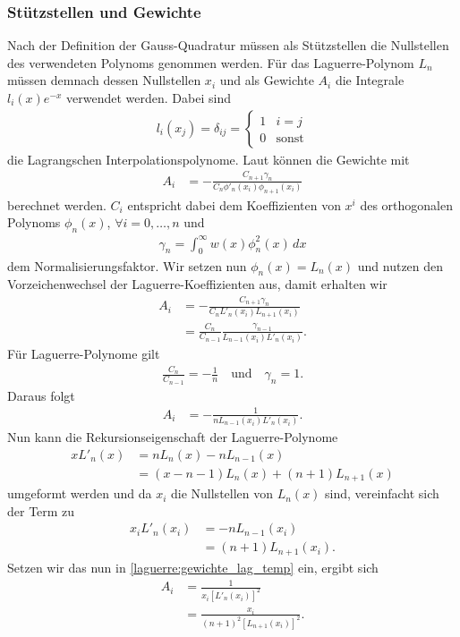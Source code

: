 \subsubsection{Stützstellen und Gewichte}
Nach der Definition der Gauss-Quadratur müssen als Stützstellen die Nullstellen
des verwendeten Polynoms genommen werden.
Für das Laguerre-Polynom $L_n$ müssen demnach dessen Nullstellen $x_i$ und
als Gewichte $A_i$ die Integrale $l_i(x)e^{-x}$ verwendet werden.
Dabei sind
\begin{align*}
l_i(x_j)
=
\delta_{ij}
=
\begin{cases}
1 & i=j      \\
0 & \text{sonst}
\end{cases}
\end{align*}
die Lagrangschen Interpolationspolynome.
Laut \cite{laguerre:hildebrand2013introduction} können die Gewichte mit
\begin{align*}
A_i
 & =
-\frac{C_{n+1} \gamma_n}{C_n \phi'_n(x_i) \phi_{n+1} (x_i)}
\end{align*}
berechnet werden.
$C_i$ entspricht dabei dem Koeffizienten von $x^i$
des orthogonalen Polynoms $\phi_n(x)$, $\forall i =0,\ldots,n$ und
\begin{align*}
\gamma_n
=
\int_0^\infty w(x) \phi_n^2(x)\,dx
\end{align*}
dem Normalisierungsfaktor.
Wir setzen nun $\phi_n(x) = L_n(x)$ und
nutzen den Vorzeichenwechsel der Laguerre-Koeffizienten aus,
damit erhalten wir
\begin{align*}
A_i
 & =
-\frac{C_{n+1} \gamma_n}{C_n L'_n(x_i) L_{n+1} (x_i)}
\\
 & = \frac{C_n}{C_{n-1}} \frac{\gamma_{n-1}}{L_{n-1}(x_i) L'_n(x_i)}
.
\end{align*}
Für Laguerre-Polynome gilt
\begin{align*}
\frac{C_n}{C_{n-1}}
=
-\frac{1}{n}
\quad \text{und} \quad
\gamma_n
=
1
.
\end{align*}
Daraus folgt
\begin{align}
A_i
&=
- \frac{1}{n L_{n-1}(x_i) L'_n(x_i)}
.
\label{laguerre:gewichte_lag_temp}
\end{align}
Nun kann die Rekursionseigenschaft der Laguerre-Polynome
\begin{align*}
x L'_n(x) 
&= 
n L_n(x) - n L_{n-1}(x)
\\
&= (x - n - 1) L_n(x) + (n + 1) L_{n+1}(x)
\end{align*}
umgeformt werden und da $x_i$ die Nullstellen von $L_n(x)$ sind,
vereinfacht sich der Term zu
\begin{align*}
x_i L'_n(x_i)
&=
- n L_{n-1}(x_i) 
\\
&=
 (n + 1) L_{n+1}(x_i)
.
\end{align*}
Setzen wir das nun in \eqref{laguerre:gewichte_lag_temp} ein,
ergibt sich
\begin{align}
\nonumber
A_i
&=
\frac{1}{x_i \left[ L'_n(x_i) \right]^2}
\\
&=
\frac{x_i}{(n+1)^2 \left[ L_{n+1}(x_i) \right]^2}
.
\label{laguerre:quadratur_gewichte}
\end{align}

